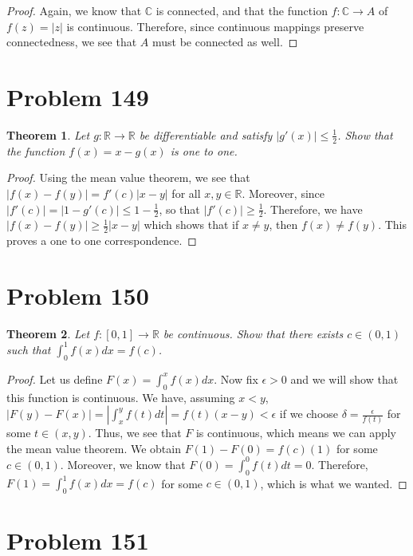 \documentclass[psamsfonts]{amsart}
\newtheorem{thm}{Theorem}[section]
\theoremstyle{definition}
\theoremstyle{remark}
\numberwithin{equation}{section}
\begin{document}
\begin{proof}
Again, we know that $\mathbb{C}$ is connected, and that the function $f: \mathbb{C} \to A$ of $f(z) = |z|$ is continuous. Therefore, since continuous mappings preserve connectedness, we see that $A$ must be connected as well. 
\end{proof}

\section{Problem 149}

\begin{thm}
Let $g: \mathbb{R} \to \mathbb{R}$ be differentiable and satisfy $|g'(x)| \leq \frac{1}{2}$. Show that the function $f(x) = x - g(x)$ is one to one.
\end{thm}

\begin{proof}
Using the mean value theorem, we see that $|f(x) - f(y)| = f'(c) |x-y|$ for all $x,y \in \mathbb{R}$. Moreover, since $|f'(c)| = |1 -g'(c)| \leq 1 - \frac{1}{2}$, so that $|f'(c)| \geq \frac{1}{2}$. Therefore,  we have $|f(x) - f(y)| \geq \frac{1}{2} |x-y|$ which shows that if $x \neq y$, then $f(x) \neq f(y)$. This proves a one to one correspondence.  
\end{proof}

\section{Problem 150}

\begin{thm}
Let $f:[0,1] \to \mathbb{R}$ be continuous. Show that there exists $c \in (0,1)$ such that $\int_0^1 f(x) dx = f(c)$. 
\end{thm}

\begin{proof}
Let us define $F(x) = \int_0^x f(x) dx$. Now fix $\epsilon > 0$ and we will show that this function is continuous. We have, assuming $x < y$, $|F(y) - F(x) | = |\int_x^y f(t) dt | = f(t) (x - y) < \epsilon$ if we choose $\delta = \frac{\epsilon}{f(t)}$ for some $t \in (x,y)$. Thus, we see that $F$ is continuous, which means we can apply the mean value theorem. We obtain $F(1) - F(0) = f(c)(1)$ for some $c \in (0,1)$. Moreover, we know that $F(0) = \int_0^0 f(t) dt = 0$. Therefore, $ F(1) = \int_0^1 f(x) dx = f(c)$ for some $c \in (0,1)$, which is what we wanted.
\end{proof}

\section{Problem 151}
\end{document}
